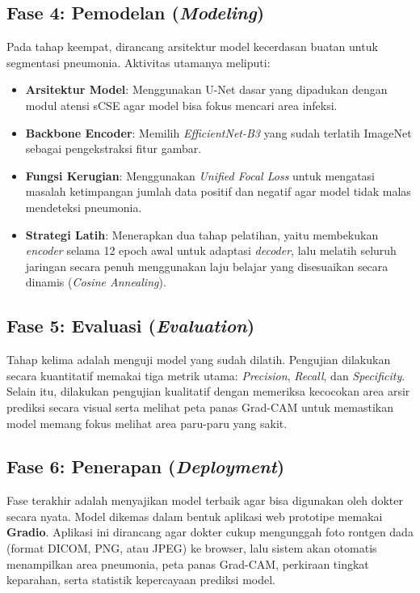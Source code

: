 \documentclass[12pt,a4paper,oneside]{book}
\begin{document}
\subsection{Fase 4: Pemodelan (\textit{Modeling})}

Pada tahap keempat, dirancang arsitektur model kecerdasan buatan untuk segmentasi pneumonia. Aktivitas utamanya meliputi:
\begin{itemize}
  \item \textbf{Arsitektur Model}: Menggunakan U-Net dasar yang dipadukan dengan modul atensi sCSE agar model bisa fokus mencari area infeksi.
  \item \textbf{Backbone Encoder}: Memilih \textit{EfficientNet-B3} yang sudah terlatih ImageNet sebagai pengekstraksi fitur gambar.
  \item \textbf{Fungsi Kerugian}: Menggunakan \textit{Unified Focal Loss} untuk mengatasi masalah ketimpangan jumlah data positif dan negatif agar model tidak malas mendeteksi pneumonia.
  \item \textbf{Strategi Latih}: Menerapkan dua tahap pelatihan, yaitu membekukan \textit{encoder} selama 12 epoch awal untuk adaptasi \textit{decoder}, lalu melatih seluruh jaringan secara penuh menggunakan laju belajar yang disesuaikan secara dinamis (\textit{Cosine Annealing}).
\end{itemize}

\subsection{Fase 5: Evaluasi (\textit{Evaluation})}

Tahap kelima adalah menguji model yang sudah dilatih. Pengujian dilakukan secara kuantitatif memakai tiga metrik utama: \textit{Precision}, \textit{Recall}, dan \textit{Specificity}. Selain itu, dilakukan pengujian kualitatif dengan memeriksa kecocokan area arsir prediksi secara visual serta melihat peta panas Grad-CAM untuk memastikan model memang fokus melihat area paru-paru yang sakit.

\subsection{Fase 6: Penerapan (\textit{Deployment})}

Fase terakhir adalah menyajikan model terbaik agar bisa digunakan oleh dokter secara nyata. Model dikemas dalam bentuk aplikasi web prototipe memakai \textbf{Gradio}. Aplikasi ini dirancang agar dokter cukup mengunggah foto rontgen dada (format DICOM, PNG, atau JPEG) ke browser, lalu sistem akan otomatis menampilkan area pneumonia, peta panas Grad-CAM, perkiraan tingkat keparahan, serta statistik kepercayaan prediksi model.
\end{document}

